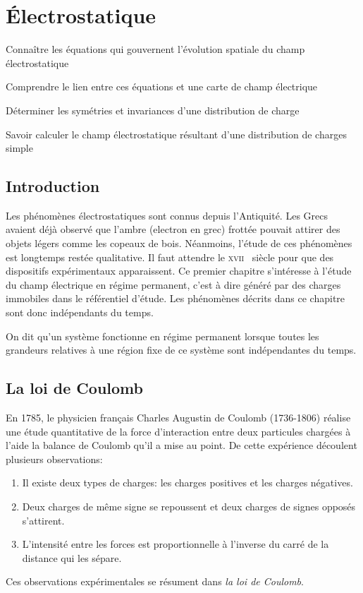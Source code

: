 \chapter{Électrostatique}
\label{chap:electrostatique}
\label{sec:objectifs}
\begin{objectif}
	\item Connaître les équations qui gouvernent l'évolution spatiale 
	  du champ électrostatique 
	\item Comprendre le lien entre ces équations et une carte de champ 
	  électrique
	\item Déterminer les symétries et invariances d'une distribution de charge
	\item Savoir calculer le champ électrostatique résultant d'une 
	  distribution de charges simple
\end{objectif}
\section*{Introduction}%
\label{sec:introduction}
Les phénomènes électrostatiques sont connus depuis l'Antiquité.
Les Grecs avaient déjà observé que l'ambre (electron en grec)
frottée pouvait attirer des objets
légers comme les copeaux de bois.
Néanmoins, l'étude de ces phénomènes est longtemps restée qualitative.
Il faut attendre le \textsc{xvii} \ieme~siècle pour que des dispositifs 
expérimentaux apparaissent.
Ce premier chapitre s'intéresse à l'étude du champ électrique 
en régime permanent, c'est à dire généré par des charges immobiles dans le 
référentiel d'étude. Les phénomènes décrits dans ce chapitre sont 
donc indépendants du temps.

\begin{defn}
	On dit qu'un système fonctionne en régime permanent lorsque toutes les
	grandeurs relatives à une région fixe de ce système sont indépendantes 
	du temps.
\end{defn}

\section{La loi de Coulomb}%
\label{sec:interaction_coulombienne}
En 1785,  le physicien français Charles Augustin de Coulomb (1736-1806)
réalise une étude quantitative de la force d'interaction entre deux particules
chargées à l'aide la balance de Coulomb qu'il a mise au point.
De cette expérience découlent plusieurs observations:

\begin{enumerate}
	\item Il existe deux types de charges: les charges positives et les
	  charges négatives.
	\item Deux charges de même signe se repoussent et deux charges de signes
	  opposés s'attirent.
	\item L'intensité entre les forces est proportionnelle à l'inverse 
	  du carré de la distance qui les sépare.
\end{enumerate}
Ces observations expérimentales se résument dans \emph{la loi de Coulomb}. 


